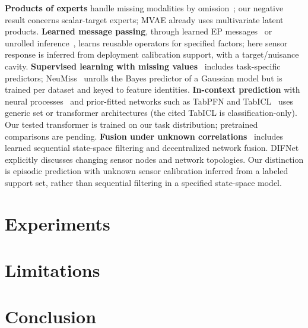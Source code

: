 \documentclass{article}
\begin{document}
\textbf{Products of experts} handle missing modalities by omission~\citep{hinton2002poe,wu2018mvae,ma2021smil}; our
negative result concerns scalar-target experts; MVAE already uses multivariate latent products. \textbf{Learned message passing}, through
learned EP messages~\citep{heess2013learning,eslami2014just,jitkrittum2015kernel} or unrolled
inference~\citep{gregor2010lista,monga2021unrolling}, learns reusable operators for specified factors; here sensor
response is inferred from deployment calibration support, with a target/nuisance cavity. \textbf{Supervised
learning with missing values}~\citep{rubin1976inference,little2019statistical,josse2019consistency} includes task-specific
predictors; NeuMiss~\citep{lemorvan2020neumiss} unrolls the Bayes predictor of a Gaussian model but is trained per
dataset and keyed to feature identities. \textbf{In-context prediction} with neural
processes~\citep{garnelo2018cnp,kim2019anp} and prior-fitted networks such as TabPFN and
TabICL~\citep{muller2022pfn,hollmann2023tabpfn,hollmann2025tabpfnv2,qu2025tabicl} uses generic set or transformer
architectures (the cited TabICL is classification-only). Our tested transformer is trained on our task distribution;
pretrained comparisons are pending. \textbf{Fusion under unknown correlations}~\citep{julier1997ci,wang2025ifnet,dong2025difnet,revach2022kalmannet}
includes learned sequential state-space filtering and decentralized network fusion. DIFNet explicitly discusses
changing sensor nodes and network topologies. Our distinction is episodic prediction with unknown sensor calibration
inferred from a labeled support set, rather than sequential filtering in a specified state-space model.

\section{Experiments}
\label{sec:experiments}


\section{Limitations}
\label{sec:limits}


\section{Conclusion}





\clearpage
\appendix


\clearpage

\end{document}
